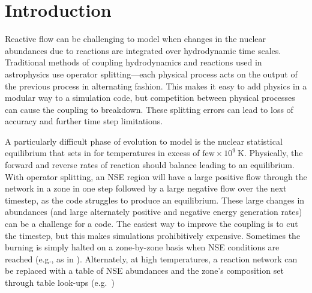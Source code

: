 \documentclass[times,modern]{aastex63}
\newcommand{\MarginPar}[1]{\marginpar{\vskip-\baselineskip\raggedright\tiny\sffamily\hrule\smallskip{\color{red}#1}\par\smallskip\hrule}}
\begin{document}

\section{Introduction}\label{Sec:Introduction}

Reactive flow can be challenging to model when changes in the
nuclear abundances due to reactions are integrated over hydrodynamic
time scales.  Traditional methods of coupling
hydrodynamics and reactions used in astrophysics use operator
splitting---each physical process acts on the output of the previous
process in alternating fashion.  This makes it easy to add physics in a modular way to a
simulation code, but competition between physical processes can cause
the coupling to breakdown.  These splitting errors can lead to loss of
accuracy and further time step limitations.

A particularly difficult phase of evolution to model is the nuclear
statistical equilibrium that sets in for
temperatures in excess of $\mbox{few} \times 10^9~\mathrm{K}$.  Physically, the
forward and reverse rates of reaction should balance leading to an equilibrium.
With operator splitting, an NSE region will have a large positive flow
through the network in a zone in one step followed by a large negative
flow over the next timestep, as the code struggles to produce an
equilibrium.  These large changes in abundances (and large alternately
positive and negative energy generation rates) can be a challenge for
a code.  The easiest way to improve the coupling is to cut the
timestep, but this makes simulations prohibitively expensive.
Sometimes the burning is simply halted on a zone-by-zone basis when
NSE conditions are reached (e.g., as in \citealt{hedet}).
Alternately, at high temperatures, a reaction network can be replaced
with a table of NSE abundances and the zone's composition set through
table look-ups (e.g.\ \citealt{ma:2013}) \MarginPar{need more here}
\end{document}
